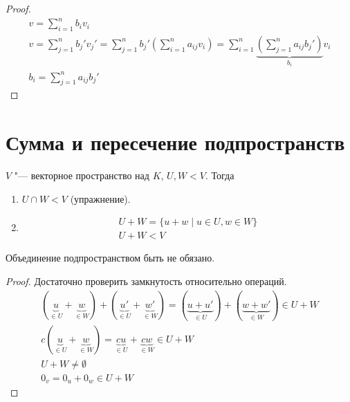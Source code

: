 \begin{proof}
	\begin{gather*}
		v = \sum_{i = 1}^{n}b_i v_i \\
		v = \sum_{j = 1}^{n}b_{j}'v_{j}' = \sum_{j = 1}^{n}b_j'\left(\sum_{i = 1}^{n}a_{ij}v_i\right)
			=\sum_{i = 1}^{n}\underbrace{\left(\sum_{j = 1}^{n}a_{ij}b_j'\right)}_{b_i}v_i \\
		b_i = \sum_{j = 1}^{n}a_{ij}b_{j}'
	\end{gather*}
\end{proof}

\section{Сумма и пересечение подпространств}

\begin{theorem}
	$V$ "--- векторное пространство над $K$,
	$U, W < V$.
	Тогда
	\begin{enumerate}
	\item
		$U \cap W < V$ (упражнение).

	\item
		\begin{gather*}
			U + W = \{u + w \mid u \in U, w \in W\} \\
			U + W < V
		\end{gather*}
	\end{enumerate}
	Объединение подпространством быть не обязано.
\end{theorem}

\begin{proof}
	Достаточно проверить замкнутость относительно операций.
	\begin{gather*}
		(\underbrace{u}_{\in U} + \underbrace{w}_{\in W}) + (\underbrace{u'}_{\in U} + \underbrace{w'}_{\in W})
			= (\underbrace{u+u'}_{\in U}) + (\underbrace{w+w'}_{\in W}) \in U + W \\
		c(\underbrace{u}_{\in U} + \underbrace{w}_{\in W}) = \underbrace{cu}_{\in U} + \underbrace{cw}_{\in W} \in U + W \\
		U + W \ne \emptyset \\
		0_v = 0_{u} + 0_{w} \in U + W
	\end{gather*}
\end{proof}

